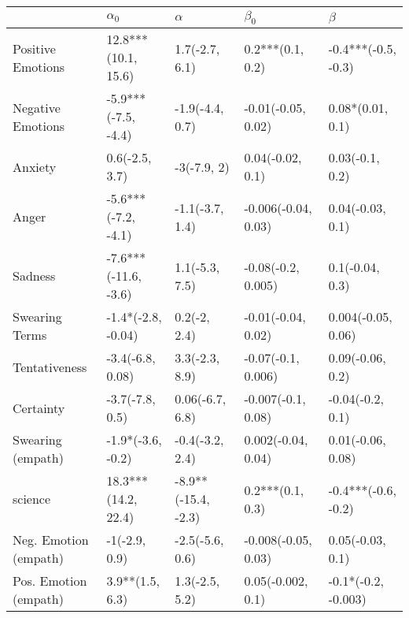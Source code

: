 \begin{tabular}{lllll}
\toprule
{} &            $\alpha_0$ &             $\alpha$ &            $\beta_0$ &              $\beta$ \\
\midrule
Positive Emotions     &   12.8***(10.1, 15.6) &       1.7(-2.7, 6.1) &     0.2***(0.1, 0.2) &  -0.4***(-0.5, -0.3) \\
Negative Emotions     &   -5.9***(-7.5, -4.4) &      -1.9(-4.4, 0.7) &   -0.01(-0.05, 0.02) &     0.08*(0.01, 0.1) \\
Anxiety               &        0.6(-2.5, 3.7) &          -3(-7.9, 2) &     0.04(-0.02, 0.1) &      0.03(-0.1, 0.2) \\
Anger                 &   -5.6***(-7.2, -4.1) &      -1.1(-3.7, 1.4) &  -0.006(-0.04, 0.03) &     0.04(-0.03, 0.1) \\
Sadness               &  -7.6***(-11.6, -3.6) &       1.1(-5.3, 7.5) &   -0.08(-0.2, 0.005) &      0.1(-0.04, 0.3) \\
Swearing Terms        &    -1.4*(-2.8, -0.04) &         0.2(-2, 2.4) &   -0.01(-0.04, 0.02) &   0.004(-0.05, 0.06) \\
Tentativeness         &      -3.4(-6.8, 0.08) &       3.3(-2.3, 8.9) &   -0.07(-0.1, 0.006) &     0.09(-0.06, 0.2) \\
Certainty             &       -3.7(-7.8, 0.5) &      0.06(-6.7, 6.8) &   -0.007(-0.1, 0.08) &     -0.04(-0.2, 0.1) \\
Swearing (empath)     &     -1.9*(-3.6, -0.2) &      -0.4(-3.2, 2.4) &   0.002(-0.04, 0.04) &    0.01(-0.06, 0.08) \\
science               &   18.3***(14.2, 22.4) &  -8.9**(-15.4, -2.3) &     0.2***(0.1, 0.3) &  -0.4***(-0.6, -0.2) \\
Neg. Emotion (empath) &         -1(-2.9, 0.9) &      -2.5(-5.6, 0.6) &  -0.008(-0.05, 0.03) &     0.05(-0.03, 0.1) \\
Pos. Emotion (empath) &       3.9**(1.5, 6.3) &       1.3(-2.5, 5.2) &    0.05(-0.002, 0.1) &  -0.1*(-0.2, -0.003) \\
\bottomrule
\end{tabular}
